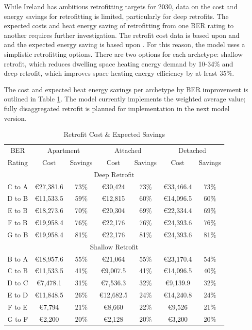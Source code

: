 \documentclass[journal abbreviation, manuscript]{copernicus}
\begin{document}
While Ireland has ambitious retrofitting targets for 2030, data on the cost and energy savings for retrofitting is limited, particularly for deep retrofits. The expected costs and heat energy saving of retrofitting from one BER rating to another requires further investigation. The retrofit cost data is based upon \cite{AECOMDECLG2013} and \cite{Ali2020} and the expected energy saving is based upon \cite{Collins2017}. For this reason, the model uses a simplistic retrofitting options. There are two options for each archetype: shallow retrofit, which reduces dwelling space heating energy demand by 10-34\% and deep retrofit, which improves space heating energy efficiency by at least 35\%. 

The cost and expected heat energy savings per archetype by BER improvement is outlined in Table \ref{Retrofit Expected Savings}. The model currently implements the weighted average value; fully disaggregated retrofit is planned for implementation in the next model version.

\begin{table}[h!]
 \centering
 \footnotesize
 \caption{Retrofit Cost \& Expected Savings}
 \begin{tabular}{ccccccc}
 \hline
 BER & \multicolumn{2}{c}{Apartment} & \multicolumn{2}{c}{Attached} & \multicolumn{2}{c}{Detached} \\ 
 Rating & Cost & Savings & Cost & Savings & Cost & Savings \\
 \hline
 \multicolumn{7}{c}{Deep Retrofit} \\
 \hline
 C to A & €27,381.6 & 73\% & €30,424 & 73\% & €33,466.4 & 73\% \\
 D to B	& €11,533.5 & 59\% & €12,815 & 60\% & €14,096.5 & 60\% \\
 E to B & €18,273.6 & 70\% & €20,304 & 69\% & €22,334.4 & 69\% \\
 F to B & €19,958.4 & 76\% & €22,176 & 76\% & €24,393.6 & 76\% \\
 G to B & €19,958.4 & 81\% & €22,176 & 81\% & €24,393.6 & 81\% \\
 \hline
 \multicolumn{7}{c}{Shallow Retrofit} \\[0.5ex]
 \hline
 B to A & €18,957.6 & 55\% & €21,064 & 55\% & €23,170.4 & 54\% \\
 C to B & €11,533.5 & 41\% & €9,007.5 & 41\% & €14,096.5 & 40\% \\
 D to C & €7,478.1 & 31\% & €7,536.3 & 32\% & €9,139.9 & 32\% \\
 E to D & €11,848.5 & 26\% & €12,682.5 & 24\% & €14,240.8 & 24\% \\
 F to E & €7,794 & 21\% & €8,660 & 22\% & €9,526 & 21\% \\
 G to F & €2,200 & 20\% & €2,128 & 20\% & €3,200 & 20\% \\ \hline
 \end{tabular}
 
 \label{Retrofit Expected Savings}
\end{table}
\end{document}
